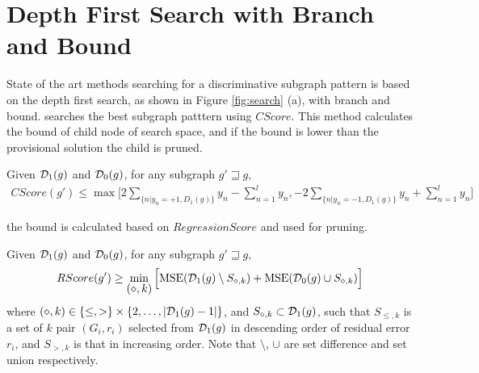 \section{Depth First Search with Branch and Bound}
State of the art methods \cite{Saigo:2009, Shirakawa:2018} 
searching for a discriminative subgraph pattern is 
based on the depth first search, as shown in Figure \ref{fig:search} (a), with branch and bound.
\cite{Saigo:2009} searches the best subgraph patttern using $CScore$. 
This method calculates the bound of child node of search space, 
and if the bound is lower than the provisional solution the child is pruned.
\begin{theorem}
  \label{thm:bound_C}
  Given $\mathcal{D}_1(g)$ and $\mathcal{D}_0(g)$, for any subgraph $g' \sqsupseteq g$,
  \begin{multline}
    \label{eq:bound_C}
    CScore(g') \leq 
    \max \Big[ 2 \sum_{\{n | y_n=+1, D_1(g)\}} y_n - \sum_{n=1}^{l}y_n, 
	-2 \sum_{\{n | y_n=-1, D_1(g)\}} y_n + \sum_{n=1}^{l}y_n \Big]
  \end{multline}
\end{theorem}
the bound is calculated based on $RegressionScore$ and used for pruning.
\begin{theorem}
  \label{thm:bound_R}
  Given $\mathcal{D}_1(g)$ and $\mathcal{D}_0(g)$, for any subgraph $g' \sqsupseteq g$,
  \begin{multline}
    \label{eq:bound_R}
    RScore(g') \geq 
    \mymin{(\diamond,k)} \Big[ \mse(\D_1(g) \setminus S_{\diamond, k}) + \mse(\D_0(g) \cup S_{\diamond, k}) \Big]
  \end{multline}
  where $ (\diamond, k) \in \{ \leq, > \} \times \{ 2, \dots, |\mathcal{D}_1(g) - 1| \} $,
  and $S_{\diamond, k} \subset \mathcal{D}_1(g)$, such that $S_{\leq, k}$ is
  a set of $k$ pair $(G_i, r_i)$ selected from $\mathcal{D}_1(g)$ in descending order of residual error $r_i$,
  and $S_{>, k}$ is that in increasing order.
  Note that $\setminus$, $\cup$ are set difference and set union respectively.
\end{theorem}
